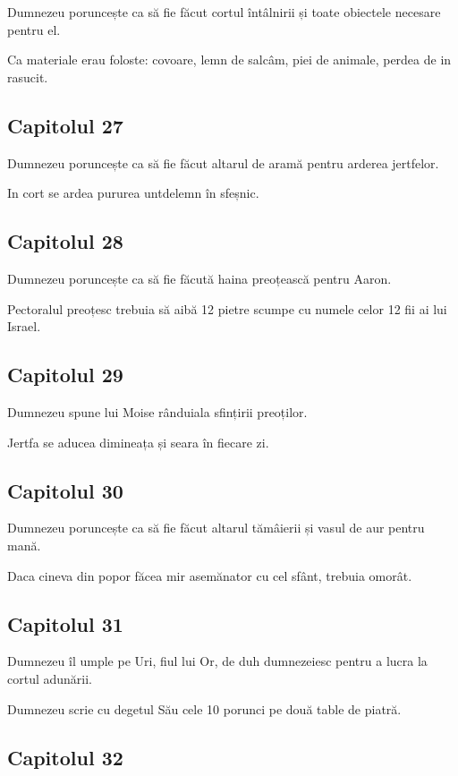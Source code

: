 \documentclass[12pt,a4paper]{article}
\begin{document}
Dumnezeu poruncește ca să fie făcut cortul întâlnirii și toate obiectele necesare pentru el.

Ca materiale erau foloste: covoare, lemn de salcâm, piei de animale, perdea de in rasucit.

\subsection{Capitolul 27}

Dumnezeu poruncește ca să fie făcut altarul de aramă pentru arderea jertfelor.

In cort se ardea pururea untdelemn în sfeșnic.

\subsection{Capitolul 28}

Dumnezeu poruncește ca să fie făcută haina preoțească pentru Aaron.

Pectoralul preoțesc trebuia să aibă 12 pietre scumpe cu numele celor 12 fii ai lui Israel.

\subsection{Capitolul 29}

Dumnezeu spune lui Moise rânduiala sfințirii preoților.

Jertfa se aducea dimineața și seara în fiecare zi.

\subsection{Capitolul 30}
Dumnezeu poruncește ca să fie făcut altarul tămâierii și vasul de aur pentru mană.

Daca cineva din popor făcea mir asemănator cu cel sfânt, trebuia omorât.

\subsection{Capitolul 31}

Dumnezeu îl umple pe Uri, fiul lui Or, de duh dumnezeiesc pentru a lucra la cortul adunării.

Dumnezeu scrie cu degetul Său cele 10 porunci pe două table de piatră.

\subsection{Capitolul 32}
\end{document}
